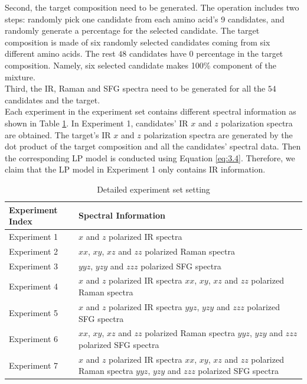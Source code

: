 Second, the target composition need to be generated. The operation includes two steps: randomly pick one candidate from each amino acid's 9 candidates, and randomly generate a percentage for the selected candidate. The target composition is made of six randomly selected candidates coming from six different amino acids. The rest $48$ candidates have $0$ percentage in the target composition. Namely, six selected candidate makes 100\% component of the mixture. \\

Third, the IR, Raman and SFG spectra need to be generated for all the $54$ candidates and the target. \\

Each experiment in the experiment set contains different spectral information as shown in Table \ref{tab:5.1}. In Experiment 1, candidates' IR $x$ and $z$ polarization spectra are obtained. The target's IR $x$ and $z$ polarization spectra are generated by the dot product of the target composition and all the candidates' spectral data. Then the corresponding LP model is conducted using Equation \ref{eq:3.4}. Therefore, we claim that the LP model in Experiment 1 only contains IR information.\\

\begin{table}
\begin{center}
{\def\arraystretch{1.5}
\begin{tabular}{| l | p{3in} | }
\hline
Experiment Index & Spectral Information \\
\hline
Experiment 1 & $x$ and $z$ polarized IR spectra\\
\hline
Experiment 2 & $xx$, $xy$, $xz$ and $zz$ polarized Raman spectra \\
\hline
Experiment 3 & $yyz$, $yzy$ and $zzz$ polarized SFG spectra \\
\hline
Experiment 4 & $x$ and $z$ polarized IR spectra \newline $xx$, $xy$, $xz$ and $zz$ polarized Raman spectra \\
\hline
Experiment 5 & $x$ and $z$ polarized IR spectra \newline $yyz$, $yzy$ and $zzz$ polarized SFG spectra　\\
\hline
Experiment 6 & $xx$, $xy$, $xz$ and $zz$ polarized Raman spectra \newline $yyz$, $yzy$ and $zzz$ polarized SFG spectra \\
\hline
Experiment 7 & $x$ and $z$ polarized IR spectra \newline
 $xx$, $xy$, $xz$ and $zz$ polarized Raman spectra \newline 
 $yyz$, $yzy$ and $zzz$ polarized SFG spectra \\
\hline
\end{tabular} 
}
\end{center}
\caption{Detailed experiment set setting} 
\label{tab:5.1} 
\end{table}	

